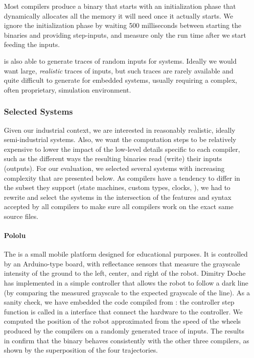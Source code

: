 Most \Lustre compilers produce a binary that starts with an initialization phase that dynamically
allocates all the memory it will need once it actually starts. We ignore the initialization phase
by waiting 500 milliseconds between starting the binaries and providing step-inputs, and
measure only the run time after we start feeding the inputs.

\BenchIt is also able to generate traces of random inputs for \Lustre systems. Ideally we would
want large, \emph{realistic} traces of inputs, but such traces are rarely available and
quite difficult to generate for embedded systems, usually requiring a complex, often
proprietary, simulation environment.

\subsubsection{Selected Systems}
\label{sec:grust:benchmarks:compare_grsync:selected_systems}

Given our industrial context, we are interested in reasonably realistic, ideally semi-industrial
systems. Also, we want the computation steps to be relatively expensive to lower the impact of the
low-level details specific to each compiler, such as the different ways the resulting binaries read
(write) their inputs (outputs).
%
For our evaluation, we selected several systems with increasing complexity that are presented below.
As \Lustre compilers have a tendency to differ in the \Lustre subset they support (state machines,
custom types, clocks, \etc), we had to rewrite and select the systems in the intersection of the
features and syntax accepted by all compilers to make sure all compilers work on the exact same
\Lustre source files.

\paragraph{Pololu}
The \href{https://www.pololu.com/docs/0J83}{\pololu} is a small mobile platform designed for
educational purposes. It is controlled by an Arduino-type board, with reﬂectance sensors that
measure the grayscale intensity of the ground to the left, center, and right of the robot. Dimitry
Doche has implemented in \Lustre a simple controller that allows the robot to follow a dark line (by
comparing the measured grayscale to the expected grayscale of the line). As a sanity check, we have
embedded the \Ci code compiled from \Lustre: the controller step function is called in a \Ci
interface that connect the hardware to the controller. We computed the position of the robot
approximated from the speed of the wheels produced by the compilers on a randomly generated trace of
inputs. The results in  confirm
that the \GLustre binary behaves consistently with the other three compilers, as shown by the
superposition of the four trajectories.

